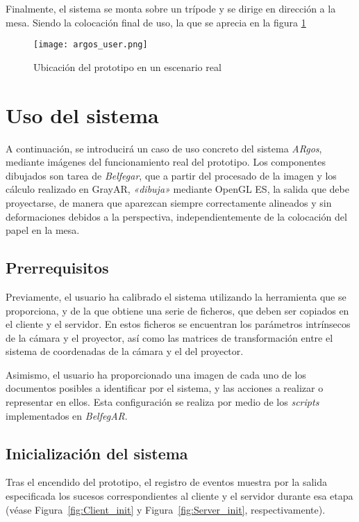 Finalmente, el sistema se monta sobre un trípode y se dirige en dirección a la mesa. Siendo la colocación final de uso, la que se aprecia en la figura \ref{fig:ARgos_user} 

\begin{figure}
  \begin{center}
    \texttt{[image: argos\_user.png]}
    \caption{Ubicación del prototipo en un escenario real}
    \label{fig:ARgos_user}
  \end{center}
\end{figure}

\section{Uso del sistema}

A continuación, se introducirá un caso de uso concreto del sistema \textit{ARgos}, mediante imágenes del funcionamiento real del prototipo. Los componentes dibujados son tarea de \textit{Belfegar}, que a partir del procesado de la imagen y los cálculo realizado en GrayAR, \textit{«dibuja»} mediante OpenGL ES, la salida que debe proyectarse, de manera que aparezcan siempre correctamente alineados y sin deformaciones debidos a la  perspectiva, independientemente de la colocación del papel en la mesa.

\subsection{Prerrequisitos}
Previamente, el usuario ha calibrado el sistema utilizando la herramienta que se proporciona, y de la que obtiene una serie de ficheros, que deben ser copiados en el cliente y el servidor. En estos ficheros se encuentran los parámetros intrínsecos de la cámara y el proyector, así como las matrices de transformación entre el sistema de coordenadas de la cámara y el del proyector.

Asimismo, el usuario ha proporcionado una imagen de cada uno de los documentos posibles a identificar por el sistema, y las acciones a realizar o representar en ellos. Esta configuración se realiza por medio de los \textit{scripts} implementados en \textit{BelfegAR}.
 
\subsection{Inicialización del sistema}
Tras el encendido del prototipo, el registro de eventos muestra por la salida especificada los sucesos correspondientes al cliente y el servidor durante esa etapa (véase Figura~\ref{fig:Client_init} y
Figura~\ref{fig:Server_init}, respectivamente). 

